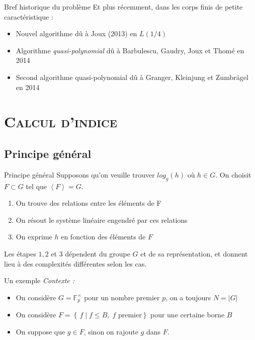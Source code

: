\documentclass[xcolor=x11names,compress]{beamer}
\theoremstyle{break}
\theoremstyle{sc}
\theoremstyle{definition}
\theoremstyle{remark}
\begin{document}
\begin{frame}{Bref historique du problème}
  Et plus récemment, dans les corps finis de petite caractéristique :
  \begin{itemize}
    \item Nouvel algorithme dû à Joux (2013) en $L(1/4)$
    \item Algorithme \emph{quasi-polynomial} dû à Barbulescu, Gaudry, Joux et
      Thomé en 2014
    \item Second algorithme quasi-polynomial dû à Granger, Kleinjung et
      Zumbrägel en 2014
  \end{itemize}
\end{frame}

\section{\scshape Calcul d'indice}
\subsection{Principe général}
\begin{frame}{Principe général}
  Supposons qu'on veuille trouver $log_g(h)$ où $h\in G$. On choisit $F\subset G$ tel que $\left\langle F \right\rangle = G$.
  \begin{enumerate}
    \item On trouve des relations entre les éléments de F
    \item On résout le système linéaire engendré par ces relations
    \item On exprime $h$ en fonction des éléments de $F$
  \end{enumerate}
  Les étapes $1, 2$ et $3$ dépendent du groupe $G$ et de sa représentation, et
  donnent lieu à des complexités différentes selon les cas.
\end{frame}
\begin{frame}{Un exemple}
  \emph{Contexte :}
  \begin{itemize}
    \item On considère $G = \mathbb{F}_p^\times$ pour un nombre premier $p$, on
      a toujours $N = |G|$
    \item On considère $F = \left\{\, f \;|\; f \leq B,\; f \text{ premier} \right\}$ pour
      une certaine borne $B$
    \item On suppose que $g\in F$, sinon on rajoute $g$ dans $F$.
  \end{itemize}
\end{frame}
\end{document}
